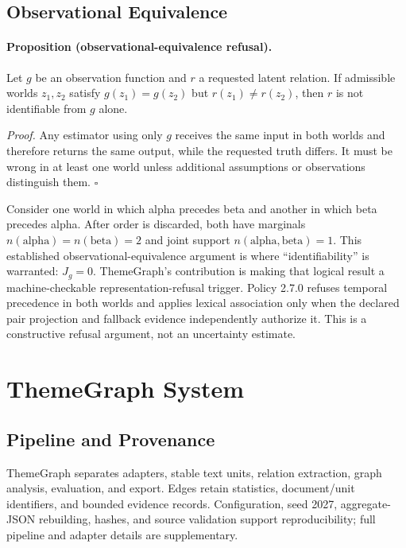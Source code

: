 \documentclass[manuscript,screen,review,anonymous]{acmart}
\begin{document}
\subsection{Observational Equivalence}

\paragraph{Proposition (observational-equivalence refusal).} Let $g$ be an observation function and $r$ a requested latent relation. If admissible worlds $z_1,z_2$ satisfy $g(z_1)=g(z_2)$ but $r(z_1)\neq r(z_2)$, then $r$ is not identifiable from $g$ alone.

\emph{Proof.} Any estimator using only $g$ receives the same input in both worlds and therefore returns the same output, while the requested truth differs. It must be wrong in at least one world unless additional assumptions or observations distinguish them. \hfill$\square$

Consider one world in which alpha precedes beta and another in which beta precedes alpha. After order is discarded, both have marginals $n(\mathrm{alpha})=n(\mathrm{beta})=2$ and joint support $n(\mathrm{alpha},\mathrm{beta})=1$. This established observational-equivalence argument is where ``identifiability'' is warranted: $J_g=0$. ThemeGraph's contribution is making that logical result a machine-checkable representation-refusal trigger. Policy 2.7.0 refuses temporal precedence in both worlds and applies lexical association only when the declared pair projection and fallback evidence independently authorize it. This is a constructive refusal argument, not an uncertainty estimate.

\section{ThemeGraph System}

\subsection{Pipeline and Provenance}

ThemeGraph separates adapters, stable text units, relation extraction, graph analysis, evaluation, and export. Edges retain statistics, document/unit identifiers, and bounded evidence records. Configuration, seed 2027, aggregate-JSON rebuilding, hashes, and source validation support reproducibility; full pipeline and adapter details are supplementary.
\end{document}
